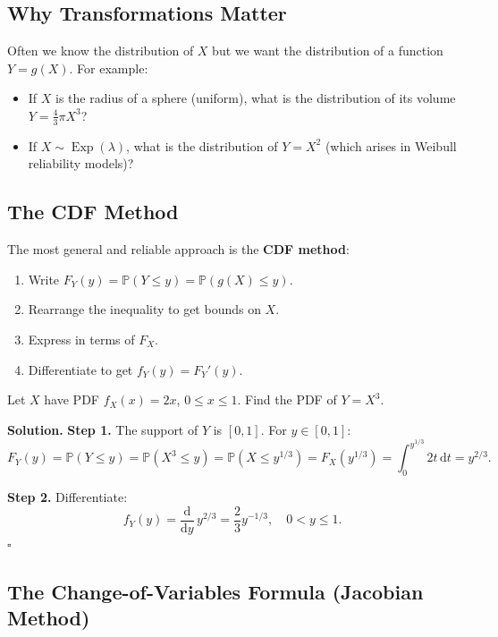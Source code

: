 \documentclass[12pt, a4paper, oneside]{book}
\theoremstyle{definition}
\theoremstyle{plain}
\theoremstyle{remark}
\newcommand{\Prob}{\mathbb{P}}
\newenvironment{solution}
  {\par\medskip\noindent\textbf{Solution.}\quad}
  {\hfill$\square$\par\medskip}
\begin{document}
\subsection{Why Transformations Matter}

Often we know the distribution of $X$ but we want the distribution of a
function $Y = g(X)$.  For example:
\begin{itemize}
  \item If $X$ is the radius of a sphere (uniform), what is the distribution
        of its volume $Y = \frac{4}{3}\pi X^3$?
  \item If $X \sim \operatorname{Exp}(\lambda)$, what is the distribution of
        $Y = X^2$ (which arises in Weibull reliability models)?
\end{itemize}

\subsection{The CDF Method}

The most general and reliable approach is the \textbf{CDF method}:
\begin{enumerate}[label=\textbf{Step \arabic*:}]
  \item Write $F_Y(y) = \Prob(Y \le y) = \Prob(g(X) \le y)$.
  \item Rearrange the inequality to get bounds on $X$.
  \item Express in terms of $F_X$.
  \item Differentiate to get $f_Y(y) = F_Y'(y)$.
\end{enumerate}

\begin{workedexample}
Let $X$ have PDF $f_X(x) = 2x$, $0\le x\le 1$.  Find the PDF of $Y = X^3$.

\begin{solution}
\textbf{Step 1.}  The support of $Y$ is $[0,1]$.  For $y\in[0,1]$:
\[
  F_Y(y) = \Prob(Y\le y) = \Prob(X^3\le y) = \Prob\!\left(X\le y^{1/3}\right)
  = F_X\!\left(y^{1/3}\right) = \int_0^{y^{1/3}} 2t\,\mathrm{d}t = y^{2/3}.
\]

\textbf{Step 2.}  Differentiate:
\[
  f_Y(y) = \frac{\mathrm{d}}{\mathrm{d}y}\,y^{2/3} = \frac{2}{3}y^{-1/3},
  \quad 0 < y \le 1.
\]
\end{solution}
\end{workedexample}

\subsection{The Change-of-Variables Formula (Jacobian Method)}
\end{document}
